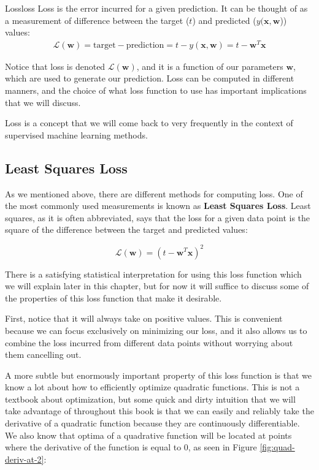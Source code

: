 \begin{definition}{Loss}{loss}
Loss is the error incurred for a given prediction. It can be thought of as a measurement of difference between the target ($t$) and predicted ($y(\textbf{x}, \textbf{w}$)) values:
\begin{align*}
    \mathcal{L}(\textbf{w}) = \text{target} - \text{prediction} = t - y(\textbf{x}, \textbf{w}) = \boxed{t - \textbf{w}^{T}\textbf{x}}
\end{align*}

Notice that loss is denoted $\mathcal{L}(\textbf{w})$, and it is a function of our parameters $\textbf{w}$, which are used to generate our prediction. Loss can be computed in different manners, and the choice of what loss function to use has important implications that we will discuss.
\end{definition}

Loss is a concept that we will come back to very frequently in the context of supervised machine learning methods.

\subsection{Least Squares Loss}
As we mentioned above, there are different methods for computing loss. One of the most commonly used measurements is known as \textbf{Least Squares Loss}. Least squares, as it is often abbreviated, says that the loss for a given data point is the square of the difference between the target and predicted values:

\begin{equation} \label{least-squares-loss-fn}
    \mathcal{L}(\textbf{w}) = (t - \textbf{w}^{T}\textbf{x})^2
\end{equation}

There is a satisfying statistical interpretation for using this loss function which we will explain later in this chapter, but for now it will suffice to discuss some of the properties of this loss function that make it desirable.

First, notice that it will always take on positive values. This is convenient because we can focus exclusively on minimizing our loss, and it also allows us to combine the loss incurred from different data points without worrying about them cancelling out.

A more subtle but enormously important property of this loss function is that we know a lot about how to efficiently optimize quadratic functions. This is not a textbook about optimization, but some quick and dirty intuition that we will take advantage of throughout this book is that we can easily and reliably take the derivative of a quadratic function because they are continuously differentiable. We also know that optima of a quadrative function will be located at points where the derivative of the function is equal to 0, as seen in Figure \ref{fig:quad-deriv-at-2}:


